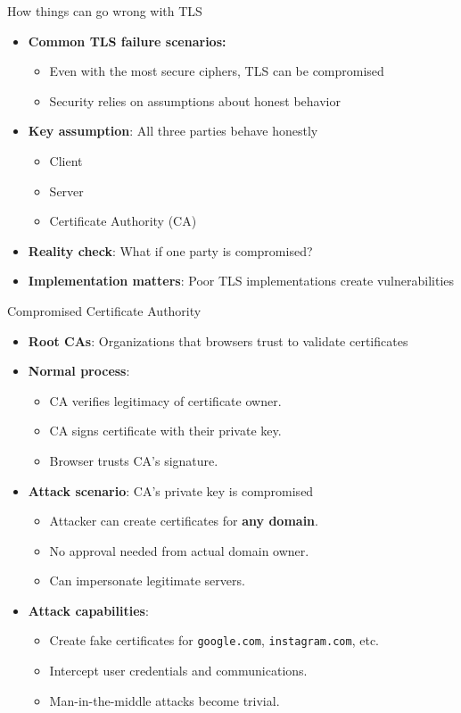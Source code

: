 \documentclass[aspectratio=169, lualatex, handout]{beamer}
\begin{document}
\begin{frame}{How things can go wrong with TLS}
	\begin{itemize}
		\item \textbf{Common TLS failure scenarios:}
		      \begin{itemize}
			      \item Even with the most secure ciphers, TLS can be compromised
			      \item Security relies on assumptions about honest behavior
		      \end{itemize}
		\item \textbf{Key assumption}: All three parties behave honestly
		      \begin{itemize}
			      \item Client
			      \item Server
			      \item Certificate Authority (CA)
		      \end{itemize}
		\item \textbf{Reality check}: What if one party is compromised?
		\item \textbf{Implementation matters}: Poor TLS implementations create vulnerabilities
	\end{itemize}
\end{frame}

\begin{frame}{Compromised Certificate Authority}
	\begin{itemize}
		\item \textbf{Root CAs}: Organizations that browsers trust to validate certificates
		\item \textbf{Normal process}:
		      \begin{itemize}
			      \item CA verifies legitimacy of certificate owner.
			      \item CA signs certificate with their private key.
			      \item Browser trusts CA's signature.
		      \end{itemize}
		\item \textbf{Attack scenario}: CA's private key is compromised
		      \begin{itemize}
			      \item Attacker can create certificates for \textbf{any domain}.
			      \item No approval needed from actual domain owner.
			      \item Can impersonate legitimate servers.
		      \end{itemize}
		\item \textbf{Attack capabilities}:
		      \begin{itemize}
			      \item Create fake certificates for \texttt{google.com}, \texttt{instagram.com}, etc.
			      \item Intercept user credentials and communications.
			      \item Man-in-the-middle attacks become trivial.
		      \end{itemize}
	\end{itemize}
\end{frame}
\end{document}
